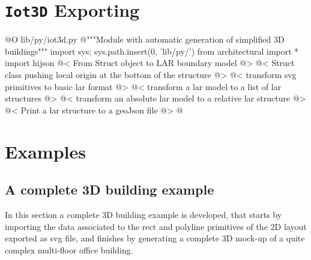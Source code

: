 \documentclass[11pt,oneside]{article}	%
\begin{document}
\section{\texttt{Iot3D} Exporting}

@O lib/py/iot3d.py
@{"""Module with automatic generation of simplified 3D buildings"""
import sys; sys.path.insert(0, 'lib/py/')
from architectural import *
import hijson
@< From Struct object to LAR boundary model @>
@< Struct class pushing local origin at the bottom of the structure @>
@< transform svg primitives to basic lar format @>
@< transform a lar model to a list of lar structures @>
@< transform an absolute lar model to a relative lar structure @>
@< Print a lar structure to a geoJson file @>
@}


\section{Examples}

\subsection{A complete 3D building example}

In this section a complete 3D building example is developed, that starts by importing the data associated to the rect and polyline primitives of the 2D layout exported as svg file, and finishes by generating a complete 3D mock-up of a quite complex multi-floor office building.
\end{document}
